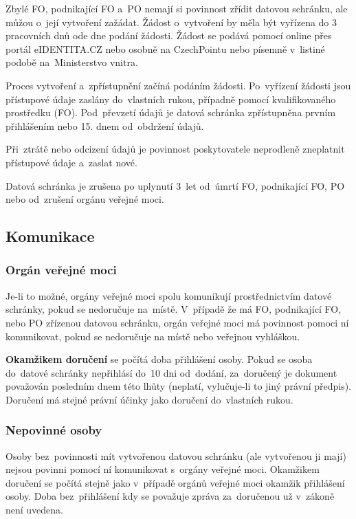 Zbylé FO, podnikající FO a~PO nemají si povinnost zřídit datovou schránku, ale můžou o~její vytvoření zažádat. Žádost o~vytvoření by měla být vyřízena do 3 pracovních dnů ode dne podání žádosti. Žádost se podává pomocí online přes portál eIDENTITA.CZ nebo osobně na CzechPointu nebo písemně v~listiné podobě na~Ministerstvo vnitra.

Proces vytvoření a~zpřístupnění začíná podáním žádosti. Po~vyřízení žádosti jsou přístupové údaje zaslány do~vlastních rukou, případně pomocí kvalifikovaného prostředku (FO). Pod~převzetí údajů je datová schránka zpřístupněna prvním přihlášením nebo 15. dnem od~obdržení údajů.

Při~ztrátě nebo odcizení údajů je povinnost poskytovatele neprodleně zneplatnit přístupové údaje a~zaslat nové.

Datová schránka je zrušena po uplynutí 3~let od~úmrtí FO, podnikající FO, PO nebo od~zrušení orgánu veřejné moci.

\subsection{Komunikace}

\subsubsection{Orgán veřejné moci}

Je-li to možné, orgány veřejné moci spolu komunikují prostřednictvím datové schránky, pokud se nedoručuje na~místě. V~případě že má FO, podnikající FO, nebo PO zřízenou datovou schránku, orgán veřejné moci má povinnost pomoci ní komunikovat, pokud se nedoručuje na místě nebo veřejnou vyhláškou.

\textbf{Okamžikem doručení} se počítá doba přihlášení osoby. Pokud se osoba do~datové schránky nepřihlásí do~10 dni od~dodání, za~doručený je dokument považován posledním dnem této lhůty (neplatí, vylučuje-li to jiný právní předpis). Doručení má stejné právní účinky jako doručení do~vlastních rukou.

\subsubsection{Nepovinné osoby}

Osoby bez~povinnosti mít vytvořenou datovou schránku (ale vytvořenou ji mají) nejsou povinni pomocí ní komunikovat s~orgány veřejné moci. Okamžikem doručení se počítá stejně jako v~případě orgánů veřejné moci okamžik přihlášení osoby. Doba bez~přihlášení kdy se považuje zpráva za~doručenou už v~zákoně není uvedena.

